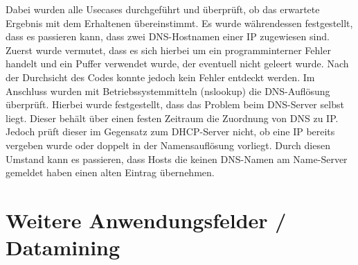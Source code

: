 Dabei wurden alle Usecases durchgeführt und überprüft, ob das erwartete Ergebnis mit dem Erhaltenen übereinstimmt.
Es wurde währendessen festgestellt, dass es passieren kann, dass zwei DNS-Hostnamen einer IP zugewiesen sind. Zuerst wurde vermutet, dass es sich hierbei um ein programminterner Fehler handelt und ein Puffer verwendet wurde, der eventuell nicht geleert wurde. Nach der Durchsicht des Codes konnte jedoch kein Fehler entdeckt werden. Im Anschluss wurden mit Betriebssystemmitteln (nslookup) die DNS-Auflösung überprüft. Hierbei wurde festgestellt, dass das Problem beim DNS-Server selbst liegt. Dieser behält über einen festen Zeitraum die Zuordnung von DNS zu IP.
Jedoch prüft dieser im Gegensatz zum DHCP-Server nicht, ob eine IP bereits vergeben wurde oder doppelt in der Namensauflösung vorliegt. Durch diesen Umstand kann es passieren, dass Hosts die keinen DNS-Namen am Name-Server gemeldet haben einen alten Eintrag übernehmen.


\section{Weitere Anwendungsfelder / Datamining}
\label{sec:otherthoughts}

